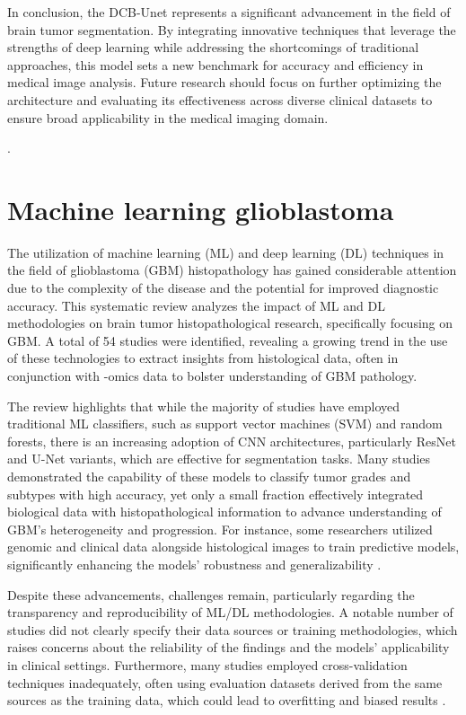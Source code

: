 \documentclass[runningheads]{llncs}
\begin{document}
In conclusion, the DCB-Unet represents a significant advancement in the field of brain tumor segmentation. By integrating innovative techniques that leverage the strengths of deep learning while addressing the shortcomings of traditional approaches, this model sets a new benchmark for accuracy and efficiency in medical image analysis. Future research should focus on further optimizing the architecture and evaluating its effectiveness across diverse clinical datasets to ensure broad applicability in the medical imaging domain.

.
\section{Machine learning glioblastoma}
The utilization of machine learning (ML) and deep learning (DL) techniques in the field of glioblastoma (GBM) histopathology has gained considerable attention due to the complexity of the disease and the potential for improved diagnostic accuracy. This systematic review analyzes the impact of ML and DL methodologies on brain tumor histopathological research, specifically focusing on GBM. A total of 54 studies were identified, revealing a growing trend in the use of these technologies to extract insights from histological data, often in conjunction with -omics data to bolster understanding of GBM pathology.

The review highlights that while the majority of studies have employed traditional ML classifiers, such as support vector machines (SVM) and random forests, there is an increasing adoption of CNN architectures, particularly ResNet and U-Net variants, which are effective for segmentation tasks. Many studies demonstrated the capability of these models to classify tumor grades and subtypes with high accuracy, yet only a small fraction effectively integrated biological data with histopathological information to advance understanding of GBM’s heterogeneity and progression. For instance, some researchers utilized genomic and clinical data alongside histological images to train predictive models, significantly enhancing the models’ robustness and generalizability \cite{35, 41, 54}.

Despite these advancements, challenges remain, particularly regarding the transparency and reproducibility of ML/DL methodologies. A notable number of studies did not clearly specify their data sources or training methodologies, which raises concerns about the reliability of the findings and the models' applicability in clinical settings. Furthermore, many studies employed cross-validation techniques inadequately, often using evaluation datasets derived from the same sources as the training data, which could lead to overfitting and biased results \cite{30, 42, 49}.
\end{document}
